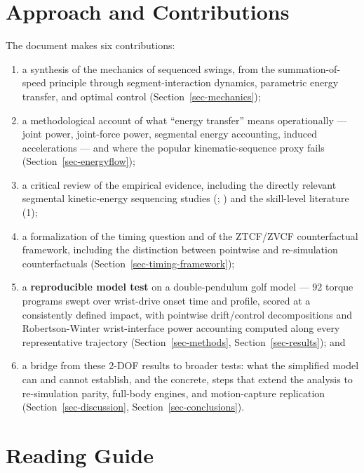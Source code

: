 \documentclass[
  letterpaper,
]{report}
\providecommand{\tightlist}{%
  \setlength{\itemsep}{0pt}\setlength{\parskip}{0pt}}
\begin{document}
\section{Approach and Contributions}\label{approach-and-contributions}

The document makes six contributions:

\begin{enumerate}
\def\labelenumi{\arabic{enumi}.}
\tightlist
\item
  a synthesis of the mechanics of sequenced swings, from the
  summation-of-speed principle through segment-interaction dynamics,
  parametric energy transfer, and optimal control
  (Section~\ref{sec-mechanics});
\item
  a methodological account of what ``energy transfer'' means
  operationally --- joint power, joint-force power, segmental energy
  accounting, induced accelerations --- and where the popular
  kinematic-sequence proxy fails (Section~\ref{sec-energyflow});
\item
  a critical review of the empirical evidence, including the directly
  relevant segmental kinetic-energy sequencing studies
  (;
  )
  and the skill-level literature (1);
\item
  a formalization of the timing question and of the ZTCF/ZVCF
  counterfactual framework, including the distinction between pointwise
  and re-simulation counterfactuals
  (Section~\ref{sec-timing-framework});
\item
  a \textbf{reproducible model test} on a double-pendulum golf model ---
  92 torque programs swept over wrist-drive onset time and profile,
  scored at a consistently defined impact, with pointwise drift/control
  decompositions and Robertson-Winter wrist-interface power accounting
  computed along every representative trajectory
  (Section~\ref{sec-methods}, Section~\ref{sec-results}); and
\item
  a bridge from these 2-DOF results to broader tests: what the
  simplified model can and cannot establish, and the concrete, steps
  that extend the analysis to re-simulation parity, full-body engines,
  and motion-capture replication (Section~\ref{sec-discussion},
  Section~\ref{sec-conclusions}).
\end{enumerate}

\section{Reading Guide}\label{reading-guide}
\end{document}
